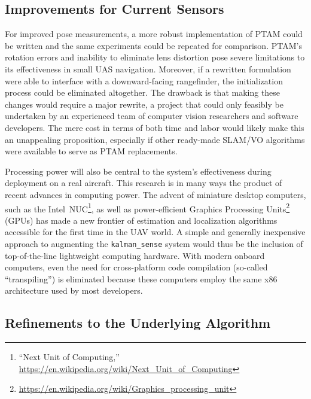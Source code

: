 \subsection{Improvements for Current Sensors}

For improved pose measurements, a more robust implementation of PTAM could be written and the same experiments could be repeated for comparison. PTAM's rotation errors and inability to eliminate lens distortion pose severe limitations to its effectiveness in small UAS navigation. Moreover, if a rewritten formulation were able to interface with a downward-facing rangefinder, the initialization process could be eliminated altogether. The drawback is that making these changes would require a major rewrite, a project that could only feasibly be undertaken by an experienced team of computer vision researchers and software developers. The mere cost in terms of both time and labor would likely make this an unappealing proposition, especially if other ready-made SLAM/VO algorithms were available to serve as PTAM replacements.

Processing power will also be central to the system's effectiveness during deployment on a real aircraft. This research is in many ways the product of recent advances in computing power. The advent of miniature desktop computers, such as the Intel~NUC\footnote{``Next Unit of Computing,'' \url{https://en.wikipedia.org/wiki/Next_Unit_of_Computing}}, as well as power-efficient Graphics Processing Units\footnote{\url{https://en.wikipedia.org/wiki/Graphics_processing_unit}} (GPUs) has made a new frontier of estimation and localization algorithms accessible for the first time in the UAV world. A simple and generally inexpensive approach to augmenting the \texttt{kalman\_sense} system would thus be the inclusion of top-of-the-line lightweight computing hardware. With modern onboard computers, even the need for cross-platform code compilation (so-called ``transpiling'') is eliminated because these computers employ the same x86 architecture used by most developers.

\subsection{Refinements to the Underlying Algorithm}

